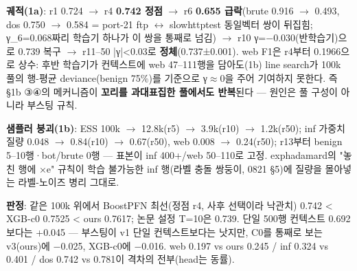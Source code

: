 \par\noindent \textbullet\enspace \textbf{궤적(1a)}: r1 0.724  \ensuremath{\rightarrow}  r4 \textbf{0.742 정점}  \ensuremath{\rightarrow}  r6 \textbf{0.655 급락}(brute 0.916 \ensuremath{\rightarrow} 0.493, dos 0.750 \ensuremath{\rightarrow} 0.584 =\allowbreak{} port-21 ftp \ensuremath{\leftrightarrow} slowhttptest 동일벡터 쌍이 뒤집힘; γ\_\allowbreak{}6=\allowbreak{}0.068짜리 학습기 하나가 이 쌍을 통째로 넘김)  \ensuremath{\rightarrow}  r10 γ=\allowbreak{}−0.030(반학습기)으로 0.739 복구  \ensuremath{\rightarrow}  r11–50 |γ|<0.03로 \textbf{정체}(0.737±0.001). web F1은 r4부터 0.1966으로 상수: 후반 학습기가 컨텍스트에 web 47–111행을 담아도(1b) line search가 100k 풀의 행-평균 deviance(benign 75\%)를 기준으로 γ\ensuremath{\approx}0을 주어 기여하지 못한다. 즉 §1b ③④의 메커니즘이 \textbf{꼬리를 과대표집한 풀에서도 반복}된다 — 원인은 풀 구성이 아니라 부스팅 규칙.


\par\noindent \textbullet\enspace \textbf{샘플러 붕괴(1b)}: ESS 100k  \ensuremath{\rightarrow}  12.8k(r5)  \ensuremath{\rightarrow}  3.9k(r10)  \ensuremath{\rightarrow}  1.2k(r50); inf 가중치 질량 0.048  \ensuremath{\rightarrow}  0.84(r10)  \ensuremath{\rightarrow}  0.67(r50), web 0.008  \ensuremath{\rightarrow}  0.24(r50); r13부터 benign 5–10행·bot/\allowbreak{}brute 0행 — 표본이 inf 400+\allowbreak{}/\allowbreak{}web 50–110로 고정. exphadamard의 "놓친 행에 ×e" 규칙이 학습 불가능한 inf 행(라벨 충돌 쌍둥이, 0821 §5)에 질량을 몰아넣는 라벨-노이즈 병리 그대로.


\par\noindent \textbullet\enspace \textbf{판정}: 같은 100k 위에서 BoostPFN 최선(정점 r4, 사후 선택이라 낙관치) 0.742 < XGB-c0 0.7525 < ours 0.7617; 논문 설정 T=\allowbreak{}10은 0.739. 단일 500행 컨텍스트 0.692보다는 +\allowbreak{}0.045 — 부스팅이 v1 단일 컨텍스트보다는 낫지만, C0를 통째로 보는 v3(ours)에 −0.025, XGB-c0에 −0.016. web 0.197 vs ours 0.245 /\allowbreak{} inf 0.324 vs 0.401 /\allowbreak{} dos 0.742 vs 0.781이 격차의 전부(head는 동률).


